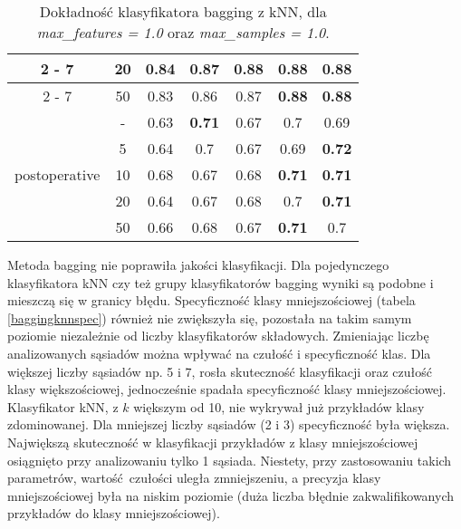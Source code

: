\begin{table}[H]
\begin{center}
{\begin{tabular}{c|c|ccccc}
				\cline{2%
					-%
					7}%
				&20&0.84&0.87&\textbf{0.88}&\textbf{0.88}&\textbf{0.88}\\%
				\cline{2%
					-%
					7}%
				&50&0.83&0.86&0.87&\textbf{0.88}&\textbf{0.88}\\%
				\hline%
				\multirow{5}{*}{postoperative}&{-}&0.63&\textbf{0.71}&0.67&0.7&0.69\\%
				\cline{2%
					-%
					7}%
				&5&0.64&0.7&0.67&0.69&\textbf{0.72}\\%
				\cline{2%
					-%
					7}%
				&10&0.68&0.67&0.68&\textbf{0.71}&\textbf{0.71}\\%
				\cline{2%
					-%
					7}%
				&20&0.64&0.67&0.68&0.7&\textbf{0.71}\\%
				\cline{2%
					-%
					7}%
				&50&0.66&0.68&0.67&\textbf{0.71}&0.7\\%
				\hline%
			\end{tabular}}
			\caption{Dokładność klasyfikatora bagging z kNN, dla \textit{max\_features = 1.0} oraz \textit{max\_samples = 1.0}.}
			\label{baggingknnacc}
		\end{center}
	\end{table}
Metoda bagging nie poprawiła jakości klasyfikacji. Dla pojedynczego klasyfikatora kNN czy też grupy klasyfikatorów bagging wyniki są podobne i mieszczą się w granicy błędu. Specyficzność klasy mniejszościowej (tabela \ref{baggingknnspec}) również nie zwiększyła się, pozostała na takim samym poziomie niezależnie od liczby klasyfikatorów składowych. Zmieniając liczbę analizowanych sąsiadów można wpływać na czułość i specyficzność klas. Dla większej liczby sąsiadów np. 5 i 7, rosła skuteczność klasyfikacji oraz czułość klasy większościowej, jednocześnie spadała specyficzność klasy mniejszościowej. Klasyfikator kNN, z $k$ większym od 10, nie wykrywał już przykładów klasy zdominowanej. Dla mniejszej liczby sąsiadów (2 i 3) specyficzność była większa. Największą skuteczność w klasyfikacji przykładów z klasy mniejszościowej osiągnięto przy analizowaniu tylko 1 sąsiada. Niestety, przy zastosowaniu takich parametrów, wartość czułości uległa zmniejszeniu, a precyzja klasy mniejszościowej była na niskim poziomie (duża liczba błędnie zakwalifikowanych przykładów do klasy mniejszościowej). \par

